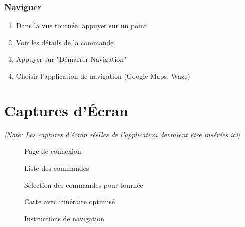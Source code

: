 \documentclass[12pt,a4paper]{report}
\begin{document}
\subsection{Naviguer}

\begin{enumerate}
    \item Dans la vue tournée, appuyer sur un point
    \item Voir les détails de la commande
    \item Appuyer sur "Démarrer Navigation"
    \item Choisir l'application de navigation (Google Maps, Waze)
\end{enumerate}

\chapter{Captures d'Écran}

\textit{[Note: Les captures d'écran réelles de l'application devraient être insérées ici]}

\begin{figure}[H]
\centering
{}
\caption{Page de connexion}
\end{figure}

\begin{figure}[H]
\centering
{}
\caption{Liste des commandes}
\end{figure}

\begin{figure}[H]
\centering
{}
\caption{Sélection des commandes pour tournée}
\end{figure}

\begin{figure}[H]
\centering
{}
\caption{Carte avec itinéraire optimisé}
\end{figure}

\begin{figure}[H]
\centering
{}
\caption{Instructions de navigation}
\end{figure}
\end{document}
